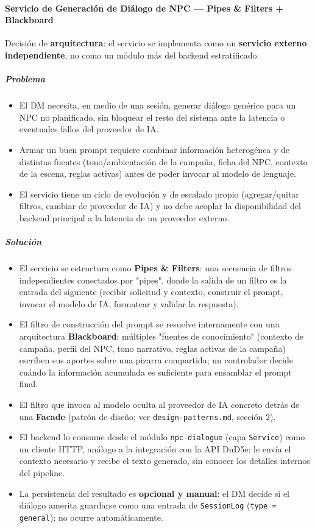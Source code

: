 \paragraph{Servicio de Generación de Diálogo de NPC — Pipes \& Filters + Blackboard}
Decisión de \textbf{arquitectura}: el servicio se implementa como un \textbf{servicio externo independiente}, no como un módulo más del backend estratificado.

\subparagraph{Problema}
\begin{itemize}[itemsep=2pt,topsep=2pt]
\item El DM necesita, en medio de una sesión, generar diálogo genérico para un NPC no planificado, sin bloquear el resto del sistema ante la latencia o eventuales fallos del proveedor de IA.
\item Armar un buen prompt requiere combinar información heterogénea y de distintas fuentes (tono/ambientación de la campaña, ficha del NPC, contexto de la escena, reglas activas) antes de poder invocar al modelo de lenguaje.
\item El servicio tiene un ciclo de evolución y de escalado propio (agregar/quitar filtros, cambiar de proveedor de IA) y no debe acoplar la disponibilidad del backend principal a la latencia de un proveedor externo.
\end{itemize}
\subparagraph{Solución}
\begin{itemize}[itemsep=2pt,topsep=2pt]
\item El servicio se estructura como \textbf{Pipes \& Filters}: una secuencia de filtros independientes conectados por "pipes", donde la salida de un filtro es la entrada del siguiente (recibir solicitud y contexto, construir el prompt, invocar el modelo de IA, formatear y validar la respuesta).
\item El filtro de construcción del prompt se resuelve internamente con una arquitectura \textbf{Blackboard}: múltiples "fuentes de conocimiento" (contexto de campaña, perfil del NPC, tono narrativo, reglas activas de la campaña) escriben sus aportes sobre una pizarra compartida; un controlador decide cuándo la información acumulada es suficiente para ensamblar el prompt final.
\item El filtro que invoca al modelo oculta al proveedor de IA concreto detrás de una \textbf{Facade} (patrón de diseño; ver \texttt{design-patterns.\allowbreak{}md}, sección 2).
\item El backend lo consume desde el módulo \texttt{npc-dialogue} (capa \texttt{Service}) como un cliente HTTP, análogo a la integración con la API DnD5e: le envía el contexto necesario y recibe el texto generado, sin conocer los detalles internos del pipeline.
\item La persistencia del resultado es \textbf{opcional y manual}: el DM decide si el diálogo amerita guardarse como una entrada de \texttt{SessionLog} (\texttt{type = general}); no ocurre automáticamente.
\end{itemize}
